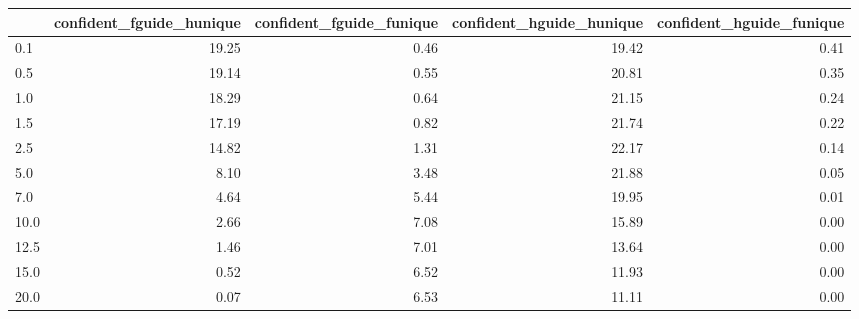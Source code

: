 \begin{tabular}{lrrrr}
\toprule
 & confident_fguide_hunique & confident_fguide_funique & confident_hguide_hunique & confident_hguide_funique \\
\midrule
0.1 & 19.25 & 0.46 & 19.42 & 0.41 \\
0.5 & 19.14 & 0.55 & 20.81 & 0.35 \\
1.0 & 18.29 & 0.64 & 21.15 & 0.24 \\
1.5 & 17.19 & 0.82 & 21.74 & 0.22 \\
2.5 & 14.82 & 1.31 & 22.17 & 0.14 \\
5.0 & 8.10 & 3.48 & 21.88 & 0.05 \\
7.0 & 4.64 & 5.44 & 19.95 & 0.01 \\
10.0 & 2.66 & 7.08 & 15.89 & 0.00 \\
12.5 & 1.46 & 7.01 & 13.64 & 0.00 \\
15.0 & 0.52 & 6.52 & 11.93 & 0.00 \\
20.0 & 0.07 & 6.53 & 11.11 & 0.00 \\
\bottomrule
\end{tabular}
